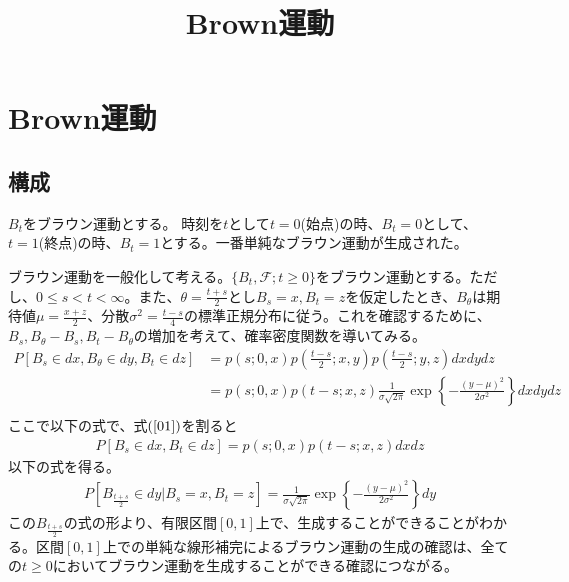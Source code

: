 \documentclass[12pt]{jarticle}
\title{Brown運動}
\begin{document}
\maketitle
\section{Brown運動}
\subsection{構成}
$\displaystyle B_t$をブラウン運動とする。
時刻を$\displaystyle t$として$\displaystyle t = 0$(始点)の時、$\displaystyle B_t = 0$として、 $\displaystyle t = 1$(終点)の時、$\displaystyle B_t = 1$とする。一番単純なブラウン運動が生成された。

ブラウン運動を一般化して考える。$\displaystyle \{B_t,\mathscr{F};t \geq 0\}$をブラウン運動とする。ただし、$\displaystyle 0 \leq s < t < \infty$。また、$\displaystyle \theta = \frac{t+s}{2}$とし$\displaystyle B_s = x,B_t = z$を仮定したとき、$\displaystyle B_\theta$は期待値$\displaystyle \mu = \frac{x+z}{2}$、分散$\displaystyle \sigma^2 = \frac{t - s}{4}$の標準正規分布に従う。これを確認するために、$\displaystyle B_s,B_\theta - B_s,B_t - B_\theta $の増加を考えて、確率密度関数を導いてみる。
\begin{align*}
  \label{01}
  \displaystyle P[B_s \in dx ,B_\theta \in dy, B_t \in dz] &= p(s;0,x)p \left(\frac{t-s}{2};x,y\right) p \left(\frac{t-s}{2};y,z\right)dx dy dz\\
  &= p(s;0,x)p(t-s;x,z)\frac{1}{\sigma\sqrt{2\pi}} \exp\left\{- \frac{(y - \mu)^2}{2\sigma^2}\right\}dx dy dz\\
  \tag{1}
\end{align*}
ここで以下の式で、式$(\ref{01})$を割ると
\begin{align*}
  \label{02}
  \displaystyle P[B_s \in dx,B_t \in dz] = p(s;0,x)p(t-s;x,z)dx dz
  \tag{2}
\end{align*}
以下の式を得る。
\begin{align*}
  \label{03}
  \displaystyle P[B_{\frac{t+s}{2}} \in dy|B_s = x,B_t = z]= \frac{1}{\sigma\sqrt{2\pi}}\exp\left\{- \frac{(y - \mu)^2}{2\sigma^2}\right\}dy
  \tag{3}
\end{align*}
この$\displaystyle B_{\frac{t+s}{2}}$の式の形より、有限区間$[0,1]$上で、生成することができることがわかる。区間$[0,1]$上での単純な線形補完によるブラウン運動の生成の確認は、全ての$t \geq 0$においてブラウン運動を生成することができる確認につながる。
\end{document}
